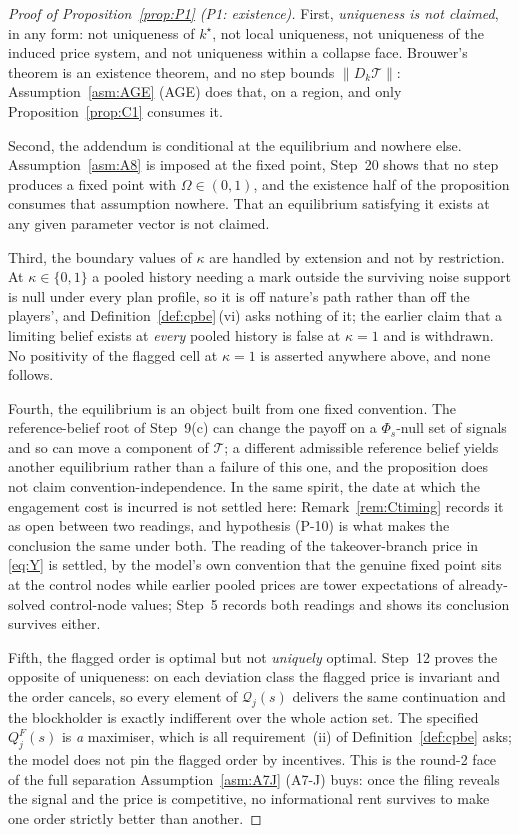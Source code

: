 \documentclass[11pt]{article}
\newcommand{\Tmap}{\mathcal{T}}
\begin{document}
\begin{proof}[Proof of Proposition~\ref{prop:P1} (P1: existence)]
First, \emph{uniqueness is not claimed}, in any form: not uniqueness of $k^\star$, not local
uniqueness, not uniqueness of the induced price system, and not uniqueness within a collapse face.
Brouwer's theorem is an existence theorem, and no step bounds $\lVert D_k\Tmap\rVert$:
Assumption~\ref{asm:AGE} (AGE) does that, on a region, and only Proposition~\ref{prop:C1} consumes it.

Second, the addendum is conditional at the equilibrium and nowhere else.
Assumption~\ref{asm:A8} is imposed at the fixed point, Step~20 shows that no step produces a fixed
point with $\Omega \in (0,1)$, and the existence half of the proposition consumes that assumption
nowhere. That an equilibrium satisfying it exists at any given parameter vector is not claimed.

Third, the boundary values of $\kappa$ are handled by extension and not by restriction. At
$\kappa \in \{0,1\}$ a pooled history needing a mark outside the surviving noise support is null
under every plan profile, so it is off nature's path rather than off the players', and
Definition~\ref{def:cpbe}\,(vi) asks nothing of it; the earlier claim that a limiting belief exists at
\emph{every} pooled history is false at $\kappa = 1$ and is withdrawn. No positivity of the flagged
cell at $\kappa = 1$ is asserted anywhere above, and none follows.

Fourth, the equilibrium is an object built from one fixed convention. The reference-belief root of
Step~9(c) can change the payoff on a $\Phi_s$-null set of signals and so can move a component of
$\Tmap$; a different admissible reference belief yields another equilibrium rather than a failure of
this one, and the proposition does not claim convention-independence. In the same spirit, the date at
which the engagement cost is incurred is not settled here: Remark~\ref{rem:Ctiming} records it as open
between two readings, and hypothesis (P-10) is what makes the conclusion the same under both. The
reading of the takeover-branch price in \eqref{eq:Y} is settled, by the model's own convention that
the genuine fixed point sits at the control nodes while earlier pooled prices are tower expectations
of already-solved control-node values; Step~5 records both readings and shows its conclusion survives
either.

Fifth, the flagged order is optimal but not \emph{uniquely} optimal. Step~12 proves the opposite of
uniqueness: on each deviation class the flagged price is invariant and the order cancels, so every
element of $\mathcal Q_j(s)$ delivers the same continuation and the blockholder is exactly
indifferent over the whole action set. The specified $Q_j^F(s)$ is \emph{a} maximiser, which is all
requirement~(ii) of Definition~\ref{def:cpbe} asks; the model does not pin the flagged order by
incentives. This is the round-2 face of the full separation Assumption~\ref{asm:A7J} (A7-J) buys: once the
filing reveals the signal and the price is competitive, no informational rent survives to make one
order strictly better than another.


\end{proof}
\end{document}
